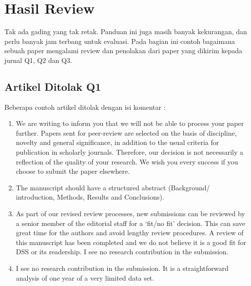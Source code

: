 \chapter{Hasil Review}

Tak ada gading yang tak retak. Panduan ini juga masih banyak kekurangan, dan perlu banyak jam terbang untuk evaluasi. Pada bagian ini contoh bagaimana sebuah paper mengalami review dan penolakan dari paper yang dikirim kepada jurnal Q1, Q2 dan Q3. 

\section{Artikel Ditolak Q1}
Beberapa contoh artikel ditolak dengan isi komentar :
\begin{enumerate}
	\item We are writing to inform you that we will not be able to process your paper further. Papers sent for peer-review are selected on the basis of discipline, novelty and general significance, in addition to the usual criteria for publication in scholarly journals. Therefore, our decision is not necessarily a reflection of the quality of your research. We wish you every success if you choose to submit the paper elsewhere.
	\item The manuscript should have a structured abstract (Background/ introduction, Methods, Results and Conclusions).
	\item As part of our revised review processes, new submissions can be reviewed by a senior member of the editorial staff for a `fit/no fit' decision.  This can save great time for the authors and avoid lengthy review procedures.  A review of this manuscript has been completed and we do not believe it is a good fit for DSS or its readership.  I see no research contribution in the submission.
	\item I see no research contribution in the submission.  It is a straightforward analysis of one year of a very limited data set.
\end{enumerate}

